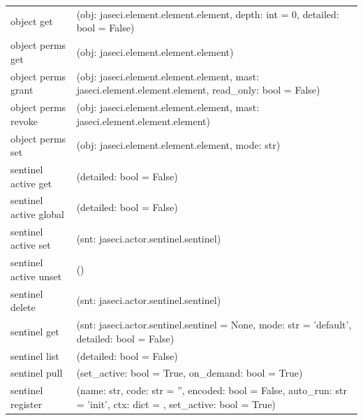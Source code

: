 {\begin{longtable}{l p{10cm}}
        object get             & (obj: jaseci.element.element.element, depth: int = 0, detailed: bool = False)                                         \\
        object perms get       & (obj: jaseci.element.element.element)                                                                                 \\
        object perms grant     & (obj: jaseci.element.element.element, mast: jaseci.element.element.element, read\_only: bool = False)                 \\
        object perms revoke    & (obj: jaseci.element.element.element, mast: jaseci.element.element.element)                                           \\
        object perms set       & (obj: jaseci.element.element.element, mode: str)                                                                      \\
        sentinel active get    & (detailed: bool = False)                                                                                              \\
        sentinel active global & (detailed: bool = False)                                                                                              \\
        sentinel active set    & (snt: jaseci.actor.sentinel.sentinel)                                                                                 \\
        sentinel active unset  & ()                                                                                                                    \\
        sentinel delete        & (snt: jaseci.actor.sentinel.sentinel)                                                                                 \\
        sentinel get           & (snt: jaseci.actor.sentinel.sentinel = None, mode: str = 'default', detailed: bool = False)                           \\
        sentinel list          & (detailed: bool = False)                                                                                              \\
        sentinel pull          & (set\_active: bool = True, on\_demand: bool = True)                                                                   \\
        sentinel register      & (name: str, code: str = '', encoded: bool = False, auto\_run: str = 'init', ctx: dict = {}, set\_active: bool = True) \\

\end{longtable}}

